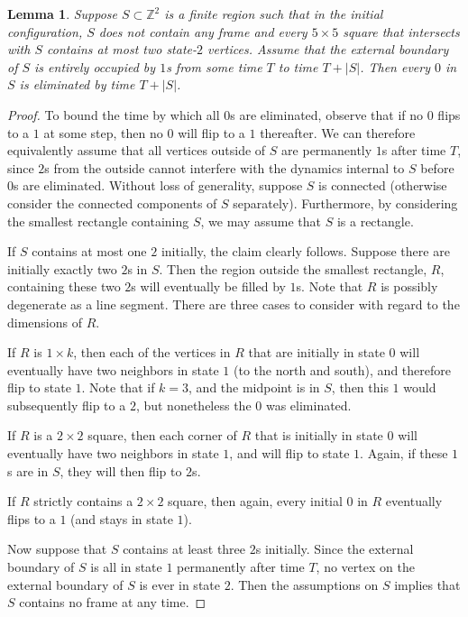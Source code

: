 \documentclass{article}
\newcommand{\bZ}{{\mathbb Z}}
\numberwithin{equation}{section}
\newtheorem{lemma}[theorem]{Lemma}
\begin{document}
\begin{lemma}\label{lem:0elimination}
    Suppose $S\subset \bZ^2$ is a finite region such that in the initial configuration, $S$ does not contain any frame and every $5 \times 5$ square that intersects with $S$ contains at most two state-$2$ vertices. 
    Assume that the external boundary of $S$ is entirely occupied by $1$s from some time $T$ to time $T+|S|$. 
    Then every $0$ in $S$ is eliminated by time $T+|S|$.
\end{lemma}
\begin{proof}
    To bound the time by which all $0$s are eliminated, observe that if no $0$ flips to a $1$ at some step, then no $0$ will flip to a $1$ thereafter. 
    We can therefore equivalently assume that all vertices outside of $S$ are permanently $1$s after time $T$, since $2$s from the outside cannot interfere with the dynamics internal to $S$ before $0$s are eliminated. 
    Without loss of generality, suppose $S$ is connected (otherwise consider the connected components of $S$ separately). 
    Furthermore, by considering the smallest rectangle containing $S$, we may assume that $S$ is a rectangle. 
    
    If $S$ contains at most one $2$ initially, the claim clearly follows.
    Suppose there are initially exactly two $2$s in $S$.
    Then the region outside the smallest rectangle, $R$, containing these two $2$s will eventually be filled by $1$s. 
    Note that $R$ is possibly degenerate as a line segment.
    There are three cases to consider with regard to the dimensions of $R$.

    If $R$ is $1 \times k$, then each of the vertices in $R$ that are initially in state $0$ will eventually have two neighbors in state $1$ (to the north and south), and therefore flip to state $1$. 
    Note that if $k=3$, and the midpoint is in $S$, then this $1$ would subsequently flip to a $2$, but nonetheless the $0$ was eliminated.

    If $R$ is a $2 \times 2$ square, then each corner of $R$ that is initially in state $0$ will eventually have two neighbors in state $1$, and will flip to state $1$. 
    Again, if these $1$s are in $S$, they will then flip to $2$s.

    If $R$ strictly contains a $2 \times 2$ square, then again, every initial $0$ in $R$ eventually flips to a $1$ (and stays in state $1$).

    Now suppose that $S$ contains at least three $2$s initially.
    Since the external boundary of $S$ is all in state $1$ permanently after time $T$, no vertex on the external boundary of $S$ is ever in state $2$.
    Then the assumptions on $S$ implies that $S$ contains no frame at any time.


\end{proof}
\end{document}

